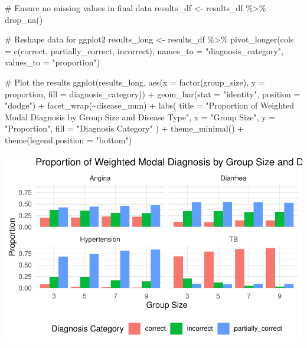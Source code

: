 \documentclass[
  letterpaper,
  DIV=11,
  numbers=noendperiod]{scrartcl}
\newenvironment{Shaded}{\begin{snugshade}}{\end{snugshade}}
\newcommand{\AttributeTok}[1]{\textcolor[rgb]{0.40,0.45,0.13}{#1}}
\newcommand{\CommentTok}[1]{\textcolor[rgb]{0.37,0.37,0.37}{#1}}
\newcommand{\FunctionTok}[1]{\textcolor[rgb]{0.28,0.35,0.67}{#1}}
\newcommand{\NormalTok}[1]{\textcolor[rgb]{0.00,0.23,0.31}{#1}}
\newcommand{\OtherTok}[1]{\textcolor[rgb]{0.00,0.23,0.31}{#1}}
\newcommand{\SpecialCharTok}[1]{\textcolor[rgb]{0.37,0.37,0.37}{#1}}
\newcommand{\StringTok}[1]{\textcolor[rgb]{0.13,0.47,0.30}{#1}}
\begin{document}
\begin{Shaded}
\begin{Highlighting}[]
\CommentTok{\# Ensure no missing values in final data}
\NormalTok{results\_df }\OtherTok{\textless{}{-}}\NormalTok{ results\_df }\SpecialCharTok{\%\textgreater{}\%}
  \FunctionTok{drop\_na}\NormalTok{()}

\CommentTok{\# Reshape data for ggplot2}
\NormalTok{results\_long }\OtherTok{\textless{}{-}}\NormalTok{ results\_df }\SpecialCharTok{\%\textgreater{}\%}
  \FunctionTok{pivot\_longer}\NormalTok{(}\AttributeTok{cols =} \FunctionTok{c}\NormalTok{(correct, partially\_correct, incorrect),}
               \AttributeTok{names\_to =} \StringTok{"diagnosis\_category"}\NormalTok{,}
               \AttributeTok{values\_to =} \StringTok{"proportion"}\NormalTok{)}

\CommentTok{\# Plot the results}
\FunctionTok{ggplot}\NormalTok{(results\_long, }\FunctionTok{aes}\NormalTok{(}\AttributeTok{x =} \FunctionTok{factor}\NormalTok{(group\_size), }\AttributeTok{y =}\NormalTok{ proportion, }\AttributeTok{fill =}\NormalTok{ diagnosis\_category)) }\SpecialCharTok{+}
  \FunctionTok{geom\_bar}\NormalTok{(}\AttributeTok{stat =} \StringTok{"identity"}\NormalTok{, }\AttributeTok{position =} \StringTok{"dodge"}\NormalTok{) }\SpecialCharTok{+}
  \FunctionTok{facet\_wrap}\NormalTok{(}\SpecialCharTok{\textasciitilde{}}\NormalTok{disease\_num) }\SpecialCharTok{+}
  \FunctionTok{labs}\NormalTok{(}
    \AttributeTok{title =} \StringTok{"Proportion of Weighted Modal Diagnosis by Group Size and Disease Type"}\NormalTok{,}
    \AttributeTok{x =} \StringTok{"Group Size"}\NormalTok{,}
    \AttributeTok{y =} \StringTok{"Proportion"}\NormalTok{,}
    \AttributeTok{fill =} \StringTok{"Diagnosis Category"}
\NormalTok{  ) }\SpecialCharTok{+}
  \FunctionTok{theme\_minimal}\NormalTok{() }\SpecialCharTok{+}
  \FunctionTok{theme}\NormalTok{(}\AttributeTok{legend.position =} \StringTok{"bottom"}\NormalTok{)}
\end{Highlighting}
\end{Shaded}

\includegraphics{simulation_files/figure-pdf/unnamed-chunk-4-1.pdf}
\end{document}
